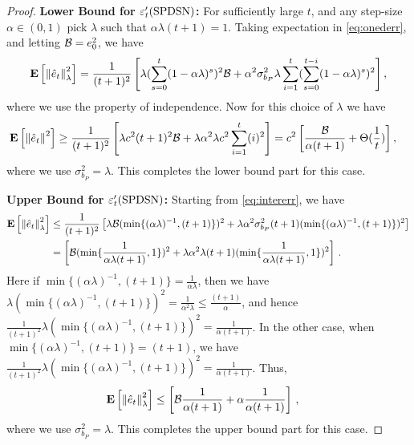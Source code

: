 \begin{proof}
\textbf{Lower Bound for $\varepsilon_t'(\mathrm{SPDSN})$:}
For sufficiently large $t$, and any step-size$\alpha \in (0,1)$ pick $\lambda$ such that $\alpha \lambda (t+1)=1$. Taking expectation in \eqref{eq:onederr}, and letting $\mathcal{B}=e_0^2$, we have
\begin{align}\label{eq:intererr}
\mathbf{E}\left[\left\| \hat{e}_t\right\|^2_{\lambda}\right]=\frac{1}{(t+1)^2}\left[ \lambda (\sum_{s=0}^t(1-\alpha \lambda)^s)^2 \mathcal{B}+ \alpha^2\sigma^2_{b_P}\lambda \sum_{i=1}^t (\sum_{s=0}^{t-i} (1-\alpha \lambda)^s)^2\right],
\end{align}
where we use the property of independence. Now for this choice of $\lambda$ we have
\begin{align}
\mathbf{E}\left[\left\| \hat{e}_t\right\|^2\right]&\geq \frac{1}{(t+1)^2}\left[ \lambda c^2(t+1)^2 \mathcal{B}+ \lambda \alpha^2 \lambda c^2\sum_{i=1}^t (i)^2\right]
= c^2\left[\frac{\mathcal{B}}{\alpha (t+1)}+   \Theta(\frac{1}{t}) \right],
\end{align}
where we use $\sigma^2_{b_P}=\lambda$. This completes the lower bound part for this case.

\textbf{Upper Bound for $\varepsilon_t'(\mathrm{SPDSN})$:}
Starting from \eqref{eq:intererr}, we have
\begin{align}
\mathbf{E}\left[\left\| \hat{e}_t\right\|^2_{\lambda}\right]
&\leq \frac{1}{(t+1)^2}\left[\lambda \mathcal{B} 
	(\min\{(\alpha\lambda)^{-1},(t+1)\})^2
		+ \lambda \alpha^2 \sigma^2_{b_P} (t+1) (\min\{(\alpha\lambda)^{-1},(t+1)\})^2 \right]\\
&= \left[\mathcal{B} 
	(\min\{\frac{1}{\alpha \lambda (t+1)},1\})^2
		+ \lambda \alpha^2 \lambda (t+1) (\min\{\frac{1}{\alpha \lambda (t+1)},1\})^2 \right]\,.
\end{align}
Here if 
$\min\{(\alpha\lambda)^{-1},(t+1)\} = \frac{1}{\alpha \lambda}$, 
then we have 
$\lambda(\min\{(\alpha\lambda)^{-1},(t+1)\})^2
	=\frac{1}{\alpha^2 \lambda}\leq \frac{(t+1)}{\alpha}$, 
	and hence 
$\frac{1}{(t+1)^2} \lambda(\min\{(\alpha\lambda)^{-1},(t+1)\})^2
						=\frac{1}{\alpha (t+1)}$. 
In the other case, when $\min\{(\alpha\lambda)^{-1},(t+1)\}=(t+1)$, we have
	$\frac{1}{(t+1)^2}\lambda(\min\{(\alpha\lambda)^{-1},(t+1)\})^2=\frac{1}{\alpha (t+1)}$. 
Thus,
\begin{align}
\mathbf{E}\left[\left\| \hat{e}_t\right\|^2_{\lambda}\right]
	&\leq \left[\mathcal{B} \frac{1}{\alpha (t+1)}+ \alpha \frac{1}{\alpha (t+1)} \right]\,,
\end{align}
where we use $\sigma^2_{b_P}=\lambda$. This completes the upper bound part for this case.
\end{proof}
